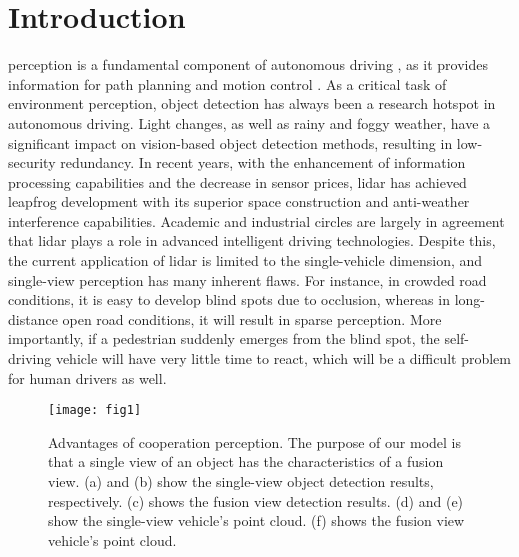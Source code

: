 \documentclass[lettersize,journal]{IEEEtran}
\begin{document}
\section{Introduction}
 perception is a fundamental component of autonomous driving \cite{1}\cite{2}, as it provides information for path planning and motion control \cite{40}\cite{41}\cite{42}. As a critical task of environment perception, object detection \cite{43}\cite{44} has always been a research hotspot in autonomous driving. Light changes, as well as rainy and foggy weather, have a significant impact on vision-based object detection methods, resulting in low-security redundancy. In recent years, with the enhancement of information processing capabilities and the decrease in sensor prices,  lidar \cite{14}\cite{16}\cite{17}\cite{20}\cite{23} has achieved leapfrog development with its superior space construction and anti-weather interference capabilities. Academic and industrial circles are largely in agreement that lidar plays a role in advanced intelligent driving technologies. Despite this, the current application of lidar is limited to the single-vehicle dimension, and single-view perception has many inherent flaws. For instance, in crowded road conditions, it is easy to develop blind spots due to occlusion, whereas in long-distance open road conditions, it will result in sparse perception. More importantly, if a pedestrian suddenly emerges from the blind spot, the self-driving vehicle will have very little time to react, which will be a difficult problem for human drivers as well.

\begin{figure}[!t]
\centering
\texttt{[image: fig1]}
\caption{Advantages of cooperation perception. The purpose of our model is that a single view of an object has the characteristics of a fusion view. (a) and (b) show the single-view object detection results, respectively. (c) shows the fusion view detection results. (d) and (e) show the single-view vehicle’s point cloud. (f) shows the fusion view vehicle’s point cloud.}
\label{fig_1}
\end{figure}
\end{document}
